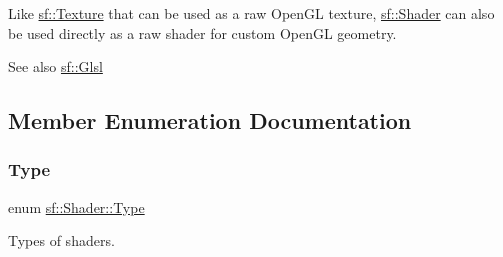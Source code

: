 Like \mbox{\hyperlink{classsf_1_1_texture}{sf\+::\+Texture}} that can be used as a raw Open\+GL texture, \mbox{\hyperlink{classsf_1_1_shader}{sf\+::\+Shader}} can also be used directly as a raw shader for custom Open\+GL geometry. 
\begin{DoxyCode}{0}
\end{DoxyCode}


\begin{DoxySeeAlso}{See also}
\mbox{\hyperlink{namespacesf_1_1_glsl}{sf\+::\+Glsl}} \begin{DoxyVerb}\end{DoxyVerb}
 
\end{DoxySeeAlso}


\subsection{Member Enumeration Documentation}
\mbox{\label{classsf_1_1_shader_afaa1aa65e5de37b74d047da9def9f9b3}} 
\subsubsection{\texorpdfstring{Type}{Type}}
{\footnotesize\ttfamily enum \mbox{\hyperlink{classsf_1_1_shader_afaa1aa65e5de37b74d047da9def9f9b3}{sf\+::\+Shader\+::\+Type}}}



Types of shaders. 

